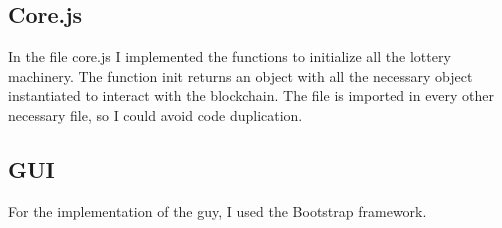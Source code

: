 \documentclass[11pt]{article}
\begin{document}
\subsection{Core.js}
In the file core.js I implemented the functions to initialize all the lottery machinery.
The function init returns an object with all the necessary object instantiated to interact
with the blockchain. The file is imported in every other necessary file, so I could avoid
code duplication.
\subsection{GUI}
For the implementation of the guy, I used the Bootstrap framework.
\end{document}

